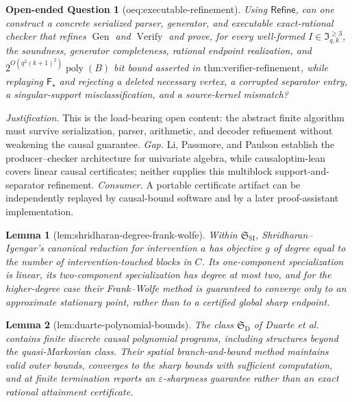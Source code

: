 \documentclass{article}
\newtheorem{lemma}{Lemma}
\newtheorem{openendedquestion}{Open-ended Question}
\begin{document}
\begin{openendedquestion}[oeq:executable-refinement]\label{oeq:executable-refinement}
Using \(\mathsf{Refine}\), can one construct a concrete serialized parser, generator, and executable exact-rational checker that refines \(\operatorname{Gen}\) and \(\operatorname{Verify}\) and prove, for every well-formed \(I\in\mathfrak I_{q,k}^{\ge3}\), the soundness, generator completeness, rational endpoint realization, and \(2^{O(q^2(k+1)^2)}\operatorname{poly}(B)\) bit bound asserted in \(\text{thm:verifier-refinement}\), while replaying \(\mathsf F_\star\) and rejecting a deleted necessary vertex, a corrupted separator entry, a singular-support misclassification, and a source-kernel mismatch?
\end{openendedquestion}
\par\smallskip\noindent \textit{Justification.} This is the load-bearing open content: the abstract finite algorithm must survive serialization, parser, arithmetic, and decoder refinement without weakening the causal guarantee. \textit{Gap.} Li, Passmore, and Paulson establish the producer--checker architecture for univariate algebra, while causaloptim-lean covers linear causal certificates; neither supplies this multiblock support-and-separator refinement. \textit{Consumer.} A portable certificate artifact can be independently replayed by causal-bound software and by a later proof-assistant implementation.

\begin{lemma}[lem:shridharan-degree-frank-wolfe]\label{lem:shridharan-degree-frank-wolfe}
Within \(\mathfrak S_{\mathrm{SI}}\), Shridharan--Iyengar's canonical reduction for intervention \(a\) has objective \(g\) of degree equal to the number of intervention-touched blocks in \(C\).  Its one-component specialization is linear, its two-component specialization has degree at most two, and for the higher-degree case their Frank--Wolfe method is guaranteed to converge only to an approximate stationary point, rather than to a certified global sharp endpoint.
\end{lemma}

\begin{lemma}[lem:duarte-polynomial-bounds]\label{lem:duarte-polynomial-bounds}
The class \(\mathfrak S_{\mathrm D}\) of Duarte et al. contains finite discrete causal polynomial programs, including structures beyond the quasi-Markovian class.  Their spatial branch-and-bound method maintains valid outer bounds, converges to the sharp bounds with sufficient computation, and at finite termination reports an \(\varepsilon\)-sharpness guarantee rather than an exact rational attainment certificate.
\end{lemma}
\end{document}
